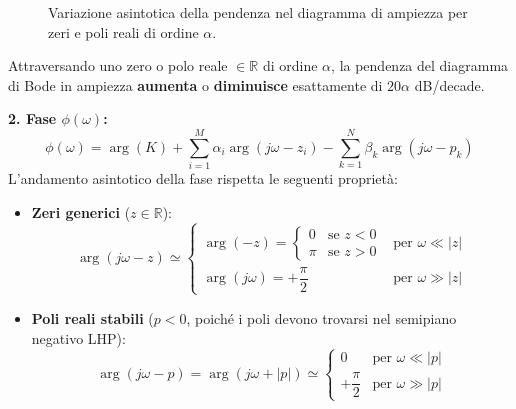 \begin{figure}[H]
\centering
{}
\caption{Variazione asintotica della pendenza nel diagramma di ampiezza per zeri e poli reali di ordine $\alpha$.}
\end{figure}

\begin{important}
Attraversando uno zero o polo reale $\in \mathbb{R}$ di ordine $\alpha$, la pendenza del diagramma di Bode in ampiezza \textbf{aumenta} o \textbf{diminuisce} esattamente di $20\alpha$ dB/decade.
\end{important}

\textbf{2. Fase $\phi(\omega)$:}
\[
    \phi(\omega) = \arg(K) + \sum_{i=1}^{M} \alpha_i \arg(j\omega - z_i) - \sum_{k=1}^{N} \beta_k \arg(j\omega - p_k)
\]
L'andamento asintotico della fase rispetta le seguenti proprietà:
\begin{itemize}
    \item \textbf{Zeri generici} ($z \in \mathbb{R}$):
    \[
        \arg(j\omega - z) \simeq \begin{cases} 
            \arg(-z) = \begin{cases} 0 & \text{se } z < 0 \\ \pi & \text{se } z > 0 \end{cases} & \text{per } \omega \ll |z| \\[0.8em]
            \arg(j\omega) = +\dfrac{\pi}{2} & \text{per } \omega \gg |z| 
        \end{cases}
    \]
    \item \textbf{Poli reali stabili} ($p < 0$, poiché i poli devono trovarsi nel semipiano negativo LHP):
    \[
        \arg(j\omega - p) = \arg(j\omega + |p|) \simeq \begin{cases} 
            0 & \text{per } \omega \ll |p| \\[0.3em]
            +\dfrac{\pi}{2} & \text{per } \omega \gg |p| 
        \end{cases}
    \]
\end{itemize}


